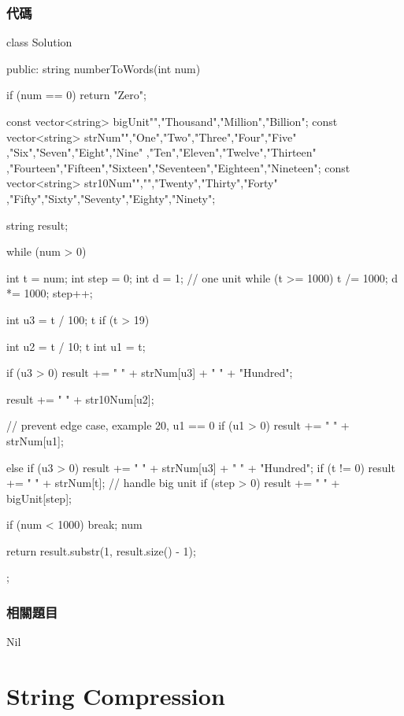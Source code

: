 \subsubsection{代碼}
\begin{Code}
class Solution
{
public:
    string numberToWords(int num) {
        if (num == 0) return "Zero";

        const vector<string> bigUnit{"","Thousand","Million","Billion"};
        const vector<string> strNum{"","One","Two","Three","Four","Five"
          ,"Six","Seven","Eight","Nine"
          ,"Ten","Eleven","Twelve","Thirteen"
          ,"Fourteen","Fifteen","Sixteen","Seventeen","Eighteen","Nineteen"};
        const vector<string> str10Num{"","","Twenty","Thirty","Forty"
          ,"Fifty","Sixty","Seventy","Eighty","Ninety"};

        string result;

        while (num > 0) {
            int t = num;
            int step = 0;
            int d = 1;  // one unit
            while (t >= 1000) {
                t /= 1000;
                d *= 1000;
                step++;
            }

            int u3 = t / 100; t %
            if (t > 19) {
                int u2 = t / 10; t %
                int u1 = t;

                if (u3 > 0)
                    result += " " + strNum[u3] + " " + "Hundred";

                result += " " + str10Num[u2];

                // prevent edge case, example 20, u1 == 0
                if (u1 > 0) result += " " + strNum[u1];
            }
            else {
                if (u3 > 0)
                    result += " " + strNum[u3] + " " + "Hundred";
                if (t != 0)
                    result += " " + strNum[t];
            }
            // handle big unit
            if (step > 0) result += " " + bigUnit[step];

            if (num < 1000) break;
            num %
        }

        return result.substr(1, result.size() - 1);
    }
};
\end{Code}


\subsubsection{相關題目}
Nil

\section{String Compression} %
\label{sec:string-compression}

